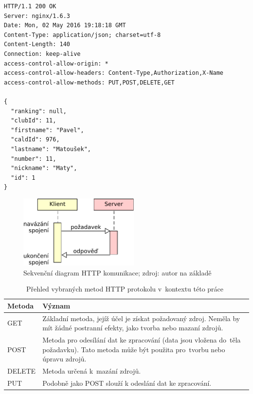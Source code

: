 \begingroup
\fontsize{9.5pt}{11pt}\selectfont
\begin{verbatim}
HTTP/1.1 200 OK
Server: nginx/1.6.3
Date: Mon, 02 May 2016 19:18:18 GMT
Content-Type: application/json; charset=utf-8
Content-Length: 140
Connection: keep-alive
access-control-allow-origin: *
access-control-allow-headers: Content-Type,Authorization,X-Name
access-control-allow-methods: PUT,POST,DELETE,GET

{
  "ranking": null,
  "clubId": 11,
  "firstname": "Pavel",
  "caldId": 976,
  "lastname": "Matoušek",
  "number": 11,
  "nickname": "Maty",
  "id": 1
}
\end{verbatim}
\endgroup

\begin{figure}[ht!]
  \centering
  \includegraphics[width=60mm]{./images/http-komunikace.pdf}
  \caption{Sekvenční diagram HTTP komunikace; zdroj: autor na základě~\cite{rest_vse}\label{overflow}}
\end{figure}

\begin{table}[ht!]
  \centering
  \begin{tabular}{|l|p{10.1cm}|}
    \hline
    \textbf{Metoda} & \textbf{Význam}\\
    \hline
    GET & Základní metoda, jejíž účel je získat požadovaný zdroj. Neměla by mít žádné postranní efekty, jako tvorba nebo mazaní zdrojů.\\
    \hline
    POST & Metoda pro odesílání dat ke zpracování (data jsou vložena do~těla požadavku). Tato metoda může být použita pro~tvorbu nebo úpravu zdrojů.\\
    \hline
    DELETE & Metoda určená k~mazání zdrojů.\\
    \hline
    PUT & Podobně jako POST slouží k odeslání dat ke zpracování.\\
    \hline
  \end{tabular}
  \caption{Přehled vybraných metod HTTP protokolu v~kontextu této práce~\cite{http_metody}}
  \label{tab:http_metody}
\end{table}

